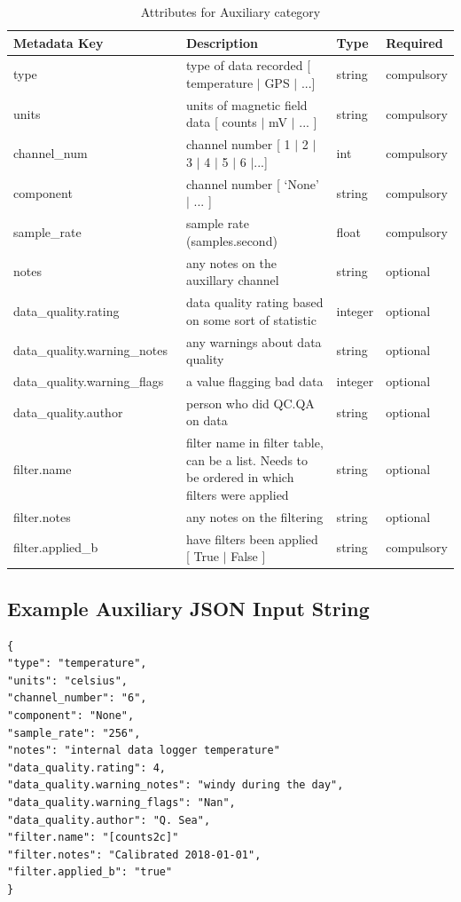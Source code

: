 \documentclass{article}
\begin{document}
\begin{table}[htb!]
    \caption[Attributes for Auxiliary Channel]{Attributes for Auxiliary category}
    \begin{tabular}{|l|p{3in}|l|l|}
        \hline
        \textbf{Metadata Key} & \textbf{Description} & \textbf{Type} & \textbf{Required} \\ \hline
        type\ & type of data recorded [ temperature $|$ GPS $|$ ...] & string & compulsory \\ \hline
        units\ & units of magnetic field data [ counts $|$ mV $|$ ... ] & string &  compulsory \\ \hline
        channel\_num\ & channel number [ 1 $|$ 2 $|$ 3 $|$ 4 $|$ 5 $|$ 6 $|$...] & int &  compulsory \\ \hline
        component\ & channel number [ `None' $|$ ... ] & string &  compulsory \\ \hline
        sample\_rate\ & sample rate (samples.second) & float &  compulsory \\ \hline
        notes\ & any notes on the auxillary channel & string &  optional \\ \hline
        data\_quality.rating\ & data quality rating based on some sort of statistic & integer &  optional \\ \hline
        data\_quality.warning\_notes\ & any warnings about data quality & string &   optional \\ \hline
        data\_quality.warning\_flags\ & a value flagging bad data  & integer &  optional \\ \hline
        data\_quality.author\ & person who did QC.QA on data & string &   optional \\ \hline
        filter.name\ & filter name in filter table, can be a list. Needs to be ordered in which filters were applied & string &  optional \\ \hline
        filter.notes\ & any notes on the filtering & string &  optional \\ \hline
        filter.applied\_b & have filters been applied [ True $|$ False ] & string & compulsory \\ \hline
    \end{tabular}
    \label{tab:aux}
\end{table}

\subsection{Example Auxiliary JSON Input String} 

\begin{verbatim}
{
"type": "temperature",
"units": "celsius",
"channel_number": "6",
"component": "None",
"sample_rate": "256",
"notes": "internal data logger temperature"
"data_quality.rating": 4,
"data_quality.warning_notes": "windy during the day",
"data_quality.warning_flags": "Nan",
"data_quality.author": "Q. Sea",
"filter.name": "[counts2c]"
"filter.notes": "Calibrated 2018-01-01",
"filter.applied_b": "true"
}
\end{verbatim}
\end{document}
